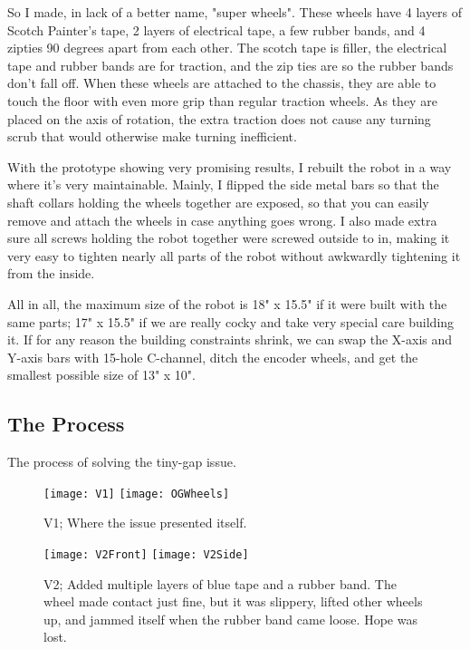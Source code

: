 So I made, in lack of a better name, "super wheels". These wheels have 4 layers of Scotch Painter's tape, 2 layers of electrical tape, a few rubber bands, and 4 zipties 90 degrees apart from each other. The scotch tape is filler, the electrical tape and rubber bands are for traction, and the zip ties are so the rubber bands don't fall off. When these wheels are attached to the chassis, they are able to touch the floor with even more grip than regular traction wheels. As they are placed on the axis of rotation, the extra traction does not cause any turning scrub \cite{TurningScrub} that would otherwise make turning inefficient.

With the prototype showing very promising results, I rebuilt the robot in a way where it's very maintainable. Mainly, I flipped the side metal bars so that the shaft collars holding the wheels together are exposed, so that you can easily remove and attach the wheels in case anything goes wrong. I also made extra sure all screws holding the robot together were screwed outside to in, making it very easy to tighten nearly all parts of the robot without awkwardly tightening it from the inside.

All in all, the maximum size of the robot is 18" x 15.5" if it were built with the same parts; 17" x 15.5" if we are really cocky and take very special care building it. If for any reason the building constraints shrink, we can swap the X-axis and Y-axis bars with 15-hole C-channel, ditch the encoder wheels, and get the smallest possible size of 13" x 10".

\subsection{The Process}
The process of solving the tiny-gap issue.

\begin{figure}[h]
    \centering
    \texttt{[image: V1]}
    \texttt{[image: OGWheels]}
    \caption{
        V1; Where the issue presented itself.
    }
\end{figure}

\begin{figure}[h]
    \centering
    \texttt{[image: V2Front]}
    \texttt{[image: V2Side]}
    \caption{
        V2; Added multiple layers of blue tape and a rubber band. The wheel made contact just fine, but it was slippery, lifted other wheels up, and jammed itself when the rubber band came loose. Hope was lost.
    }
\end{figure}


